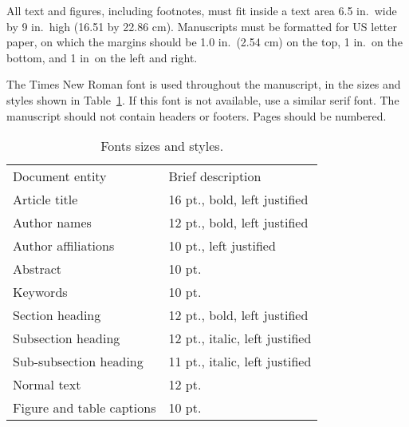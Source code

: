All text and figures, including footnotes, must fit inside a text area 6.5 in.\ wide by 9 in.\ high (16.51 by 22.86 cm). Manuscripts must be formatted for US letter paper, on which the margins should be 1.0 in.\ (2.54 cm) on the top, 1 in.\ on the bottom, and 1 in\ on the left and right. 

The Times New Roman font is used throughout the manuscript, in the sizes and styles shown in Table~\ref{tab:fonts}. If this font is not available, use a similar serif font. The manuscript should not contain headers or footers. Pages should be numbered.

\begin{table}
\caption{Fonts sizes and styles.} 
\label{tab:fonts}
\begin{center}       
\begin{tabular}{ll} %
\hline 
Document entity & Brief description  \\
Article title & 16 pt., bold, left justified  \\
Author names & 12 pt., bold, left justified   \\
Author affiliations & 10 pt., left justified   \\
Abstract & 10 pt.  \\
Keywords & 10 pt.  \\
Section heading & 12 pt., bold, left justified  \\
Subsection heading & 12 pt., italic, left justified  \\
Sub-subsection heading & 11 pt., italic, left justified  \\
Normal text & 12 pt. \\
Figure and table captions &  10 pt. \\
\hline 
\end{tabular}
\end{center}
\end{table} 
